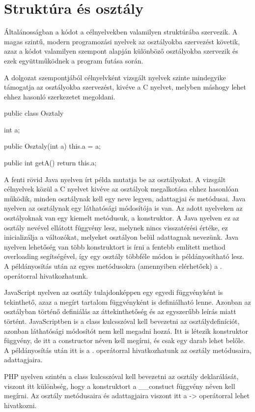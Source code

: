 \section{Struktúra és osztály}

Általánosságban a kódot a célnyelvekben valamilyen struktúrába szervezik. A magas szintű, modern programozási nyelvek az osztályokba szervezést követik, azaz a kódot valamilyen szempont alapján különböző osztályokba szervezik és ezek együttműködnek a program futása során.

A dolgozat szempontjából célnyelvként vizsgált nyelvek szinte mindegyike támogatja az osztályokba szervezést, kivéve a C nyelvet, melyben máshogy lehet ehhez hasonló szerkezetet megoldani.

\begin{cpp}
	public class Osztaly {
		int a;
		
		public Osztaly(int a) {
			this.a = a;
		}
	
		public int getA() {
			return this.a;
		}
	}
\end{cpp}

A fenti rövid Java nyelven írt példa mutatja be az osztályokat. A vizsgált célnyelvek közül a C nyelvet kivéve az osztályok megalkotása ehhez hasonlóan működik, minden osztálynak kell egy neve legyen, adattagjai és metódusai. Java nyelven az osztálynak egy láthatósági módosítója is van. Az adott nyelveken az osztályoknak van egy kiemelt metódusuk, a konstruktor. A Java nyelven ez az osztály nevével ellátott függvény lesz, melynek nincs visszatérési értéke, ez inicializálja a változókat, melyeket osztályon belül adattagnak nevezünk. Java nyelven lehetőség van több konstruktort is írni a fentebb említett method overloading segítségével, így egy osztály többféle módon is példányosítható lesz.
A példányosítás után az egyes metódusokra (amennyiben elérhetőek) a . operátorral hivatkozhatunk.

JavaScript nyelven az osztály tulajdonképpen egy egyedi függvényként is tekinthető, azaz a megírt tartalom függvényként is definiálható lenne. Azonban az osztályban történő definiálás az áttekinthetőség és az egyszerűbb leírás miatt történt. JavaScriptben is a class kulcsszóval kell bevezetni az osztálydefiníciót, azonban láthatósági módosítót nem kell megadni hozzá. Itt is létezik konstruktor függvény, de itt a constructor néven kell megírni, és csak egy darab lehet belőle. A példányosítás után itt is a . operátorral hivatkozhatunk az osztály metódusaira, adattagjaira.

PHP nyelven szintén a class kulcsszóval kell bevezetni az osztály deklarálását, viszont itt különbség, hogy a konstruktort a \_\_constuct függvény néven kell megírni. Az osztály metódusaira és adattagjaira viszont itt a -> operátorral lehet hivatkozni.

